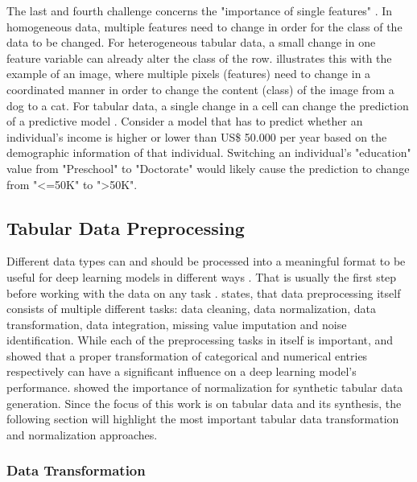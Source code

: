 The last and fourth challenge concerns the "importance of single features" \cite[p. 4]{borisov2022DeepNeuralNetworks}. 
In homogeneous data, multiple features need to change in order for the class of the data to be changed. 
For heterogeneous tabular data, a small change in one feature variable can already alter the class of the row. 
\cite{borisov2022DeepNeuralNetworks} illustrates this with the example of an image, where multiple pixels (\ie features) need to change in a coordinated manner in order to change the content (\ie class) of the image from a dog to a cat.
For tabular data, a single change in a cell can change the prediction of a predictive model \cite{borisov2022DeepNeuralNetworks}. 
Consider a model that has to predict whether an individual's income is higher or lower than US\$ 50.000 per year \cite{Dua:2019} based on the demographic information of that individual.
Switching an individual's "education" value from "Preschool" to "Doctorate" would likely cause the prediction to change from "<=50K" to ">50K".


\subsection{Tabular Data Preprocessing}
\label{sec:preprocessing}

Different data types can and should be processed into a meaningful format to be useful for deep learning models in different ways \cite{fan2020RelationalDataSynthesisa, lederrey2022DATGANIntegratingExperta}.
That is usually the first step before working with the data on any task \cite{izonin2022TwoStepDataNormalization}.
\cite{garcia2016BigDataPreprocessing} states, that data preprocessing itself consists of multiple different tasks: data cleaning, data normalization, data transformation, data integration, missing value imputation and noise identification.
While each of the preprocessing tasks in itself is important, 
\cite{fitkov-norris2012EvaluatingImpactCategorical} and \cite{gorishniy2022EmbeddingsNumericalFeatures} showed that a proper transformation of categorical and numerical entries respectively can have a significant influence on a deep learning model's performance.
\cite{xu2019ModelingTabularData} showed the importance of normalization for synthetic tabular data generation.
Since the focus of this work is on tabular data and its synthesis, the following section will highlight the most important tabular data transformation and normalization approaches.

\subsubsection{Data Transformation}
\label{sec:dataTransformation}

